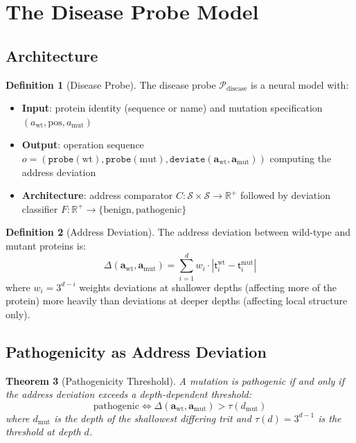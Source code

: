 \documentclass[11pt,twocolumn,a4paper]{article}
\newtheorem{theorem}{Theorem}[section]
\theoremstyle{definition}
\newtheorem{definition}[theorem]{Definition}
\theoremstyle{remark}
\newcommand{\Sspace}{\mathcal{S}}
\newcommand{\R}{\mathbb{R}}
\newcommand{\addr}{\mathbf{a}}
\newcommand{\trit}{\mathsf{t}}
\newcommand{\probe}{\mathcal{P}}
\begin{document}
\section{The Disease Probe Model}
\label{sec:disease_probe}

\subsection{Architecture}

\begin{definition}[Disease Probe]
\label{def:disease_probe}
The disease probe $\probe_{\text{disease}}$ is a neural model with:
\begin{itemize}
    \item \textbf{Input}: protein identity (sequence or name) and mutation specification $(a_{\text{wt}}, \text{pos}, a_{\text{mut}})$
    \item \textbf{Output}: operation sequence $o = (\texttt{probe}(\text{wt}), \texttt{probe}(\text{mut}), \texttt{deviate}(\addr_{\text{wt}}, \addr_{\text{mut}}))$ computing the address deviation
    \item \textbf{Architecture}: address comparator $C: \Sspace \times \Sspace \to \R^+$ followed by deviation classifier $F: \R^+ \to \{\text{benign}, \text{pathogenic}\}$
\end{itemize}
\end{definition}

\begin{definition}[Address Deviation]
\label{def:address_deviation}
The address deviation between wild-type and mutant proteins is:
\begin{equation}
\Delta(\addr_{\text{wt}}, \addr_{\text{mut}}) = \sum_{i=1}^{d} w_i \cdot |\trit_i^{\text{wt}} - \trit_i^{\text{mut}}|
\end{equation}
where $w_i = 3^{d-i}$ weights deviations at shallower depths (affecting more of the protein) more heavily than deviations at deeper depths (affecting local structure only).
\end{definition}

\subsection{Pathogenicity as Address Deviation}

\begin{theorem}[Pathogenicity Threshold]
\label{thm:pathogenicity}
A mutation is pathogenic if and only if the address deviation exceeds a depth-dependent threshold:
\begin{equation}
\text{pathogenic} \iff \Delta(\addr_{\text{wt}}, \addr_{\text{mut}}) > \tau(d_{\text{mut}})
\end{equation}
where $d_{\text{mut}}$ is the depth of the shallowest differing trit and $\tau(d) = 3^{d-1}$ is the threshold at depth $d$.
\end{theorem}
\end{document}
